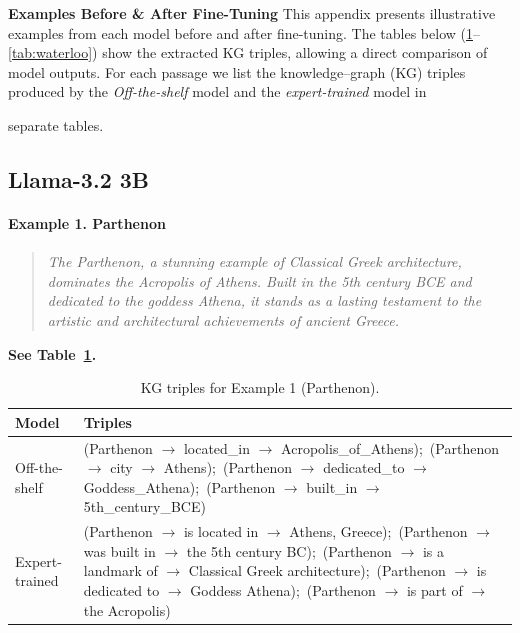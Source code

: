 \documentclass[11pt]{article}
\begin{document}
\textbf{Examples Before \& After Fine-Tuning}
This appendix presents illustrative examples from each model before and after fine-tuning. The tables below (\ref{tab:parthenon}--\ref{tab:waterloo}) show the extracted KG triples, allowing a direct comparison of model outputs. For each passage we list the knowledge–graph (KG) triples produced by the \emph{Off-the-shelf} model and the \emph{expert-trained} model in {separate
tables.

\subsection{Llama-3.2 3B}

\paragraph{Example 1. Parthenon}
\begin{quote}\small
\textit{The Parthenon, a stunning example of Classical Greek architecture, dominates the
Acropolis of Athens. Built in the 5th century BCE and dedicated to the goddess Athena, it
stands as a lasting testament to the artistic and architectural achievements of ancient
Greece.} 
\end{quote}
\noindent\textbf{See Table~\ref{tab:parthenon}.}

\begin{table}[h]
\centering\small
\caption{KG triples for Example 1 (Parthenon).}\label{tab:parthenon}
\begin{tabular}{@{}p{}p{}@{}}
\textbf{Model} & \textbf{Triples}\\\hline
Off-the-shelf &
\ttfamily(Parthenon $\to$ located\_in $\to$ Acropolis\_of\_Athens);\,
(Parthenon $\to$ city $\to$ Athens);\,
(Parthenon $\to$ dedicated\_to $\to$ Goddess\_Athena);\,
(Parthenon $\to$ built\_in $\to$ 5th\_century\_BCE)
\\
Expert-trained &
\ttfamily(Parthenon $\to$ is located in $\to$ Athens, Greece);\,
(Parthenon $\to$ was built in $\to$ the 5th century BC);\,
(Parthenon $\to$ is a landmark of $\to$ Classical Greek architecture);\,
(Parthenon $\to$ is dedicated to $\to$ Goddess Athena);\,
(Parthenon $\to$ is part of $\to$ the Acropolis)
\end{tabular}
\end{table}

}
\end{document}
